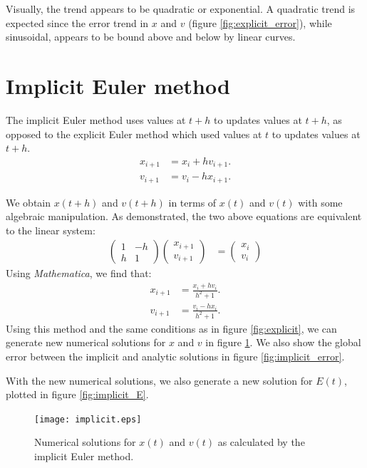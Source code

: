 \documentclass{article}
\theoremstyle{definition}
\renewcommand{\>}{\rangle}
\newcommand{\<}{\langle}
\begin{document}
Visually, the trend appears to be quadratic or exponential. A quadratic trend
is expected since the error trend in $x$ and $v$ (figure \ref{fig:explicit_error}),
while sinusoidal, appears to be bound above and below by linear curves.

\section{Implicit Euler method}

The implicit Euler method uses values at $t+h$ to updates values at $t+h$, as
opposed to the explicit Euler method which used values at $t$ to updates values
at $t+h$.
\begin{align*}
x_{i+1} &= x_i + hv_{i+1}. \\
v_{i+1} &= v_i - hx_{i+1}.
\end{align*}

We obtain $x(t+h)$ and $v(t+h)$ in terms of $x(t)$ and $v(t)$ with some algebraic
manipulation. As demonstrated, the two above equations are equivalent to the
linear system:
\begin{align*}
\left(\begin{array}{cc}
1 & -h \\
h & 1
\end{array}\right)
\left(\begin{array}{c}
x_{i+1} \\
v_{i+1}
\end{array}\right)
&=
\left(\begin{array}{c}
x_i \\
v_i
\end{array}\right)
\end{align*}
Using \emph{Mathematica}, we find that:
\begin{align*}
x_{i+1} &= \frac{x_i + hv_i}{h^2 + 1}. \\
v_{i+1} &= \frac{v_i - hx_i}{h^2 + 1}.
\end{align*}
Using this method and the same conditions as in figure \ref{fig:explicit}, we can
generate new numerical solutions for $x$ and $v$ in figure \ref{fig:implicit}.
We also show the global error between the implicit and analytic solutions
in figure \ref{fig:implicit_error}.

With the new numerical solutions, we also generate a new solution for
$E(t)$, plotted in figure \ref{fig:implicit_E}. 

\begin{figure}
\texttt{[image: implicit.eps]}
\caption{\label{fig:implicit}Numerical solutions for $x(t)$ and $v(t)$ as calculated by
the implicit Euler method.}
\end{figure}
\end{document}
